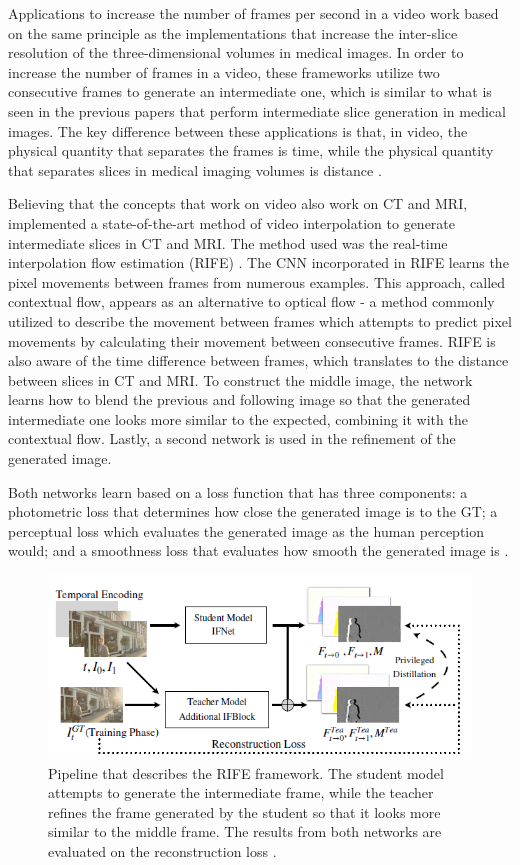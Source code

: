 Applications to increase the number of frames per second in a video work based on the same principle as the implementations that increase the inter-slice resolution of the three-dimensional volumes in medical images. In order to increase the number of frames in a video, these frameworks utilize two consecutive frames to generate an intermediate one, which is similar to what is seen in the previous papers that perform intermediate slice generation in medical images. The key difference between these applications is that, in video, the physical quantity that separates the frames is time, while the physical quantity that separates slices in medical imaging volumes is distance \parencite{Fang2022, Gambini2024}.
\par
Believing that the concepts that work on video also work on CT and MRI, \textcite{Gambini2024} implemented a state-of-the-art method of video interpolation to generate intermediate slices in CT and MRI. The method used was the real-time interpolation flow estimation (RIFE) \parencite{Huang2022}. The CNN incorporated in RIFE learns the pixel movements between frames from numerous examples. This approach, called contextual flow, appears as an alternative to optical flow - a method commonly utilized to describe the movement between frames which attempts to predict pixel movements by calculating their movement between consecutive frames. RIFE is also aware of the time difference between frames, which translates to the distance between slices in CT and MRI. To construct the middle image, the network learns how to blend the previous and following image so that the generated intermediate one looks more similar to the expected, combining it with the contextual flow. Lastly, a second network is used in the refinement of the generated image.
\par
Both networks learn based on a loss function that has three components: a photometric loss that determines how close the generated image is to the GT; a perceptual loss which evaluates the generated image as the human perception would; and a smoothness loss that evaluates how smooth the generated image is \parencite{Huang2022}.

\begin{figure}[!ht]
	\centering
	\includegraphics[width=0.85\linewidth]{figures/RIFEPipeline.png}
	\caption{Pipeline that describes the RIFE framework. The student model attempts to generate the intermediate frame, while the teacher refines the frame generated by the student so that it looks more similar to the middle frame. The results from both networks are evaluated on the reconstruction loss \parencite{Huang2022}.}
	\label{fig:RIFEPipeline}
\end{figure}


